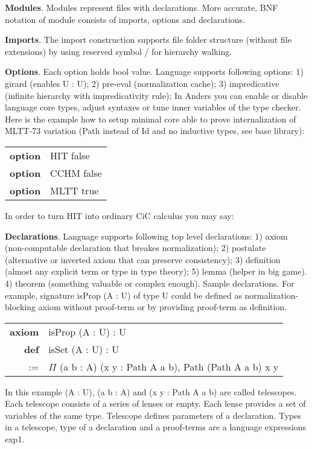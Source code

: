 \documentclass[a4paper,UKenglish,cleveref, autoref, thm-restate]{lipics-v2021}
\begin{document}
\textbf{Modules}. Modules represent files with declarations. More accurate, BNF notation of module consists of imports, options and declarations.

\textbf{Imports}. The import construction supports file folder structure (without file extensions) by using reserved symbol / for hierarchy walking.

\textbf{Options}. Each option holds bool value. Language supports following options: 1) girard (enables U : U); 2) pre-eval (normalization cache);
3) impredicative (infinite hierarchy with impredicativity rule);
In Anders you can enable or disable language core types, adjust syntaxes or tune inner variables of the type checker. Here is the example how to setup minimal core able to prove internalization of MLTT-73 variation (Path instead of Id and no inductive types, see base library):

\begin{table}[ht]
\begin{tabular}{rl}
\textbf{option} & HIT false \\
\textbf{option} & CCHM false \\
\textbf{option} & MLTT true \\
\end{tabular}
\end{table}

In order to turn HIT into ordinary CiC calculus you may say:

\textbf{Declarations}. Language supports following top level declarations: 1) axiom (non-computable declaration that breakes normalization); 2) postulate (alternative or inverted axiom that can preserve consistency); 3) definition (almost any explicit term or type in type theory); 5) lemma (helper in big game). 4) theorem (something valuable or complex enough).
Sample declarations. For example, signature isProp (A : U) of type U could be defined as normalization-blocking axiom without proof-term or by providing proof-term as definition.
\begin{table}[ht]
\begin{tabular}{rl}
\textbf{axiom} & isProp (A : U) : U \\
\textbf{def} & isSet (A : U) : U \\
 := & \textbf{$\Pi$} (a b : A) (x y : Path A a b), Path (Path A a b) x y \\
\end{tabular}
\end{table}


In this example (A : U), (a b : A) and (x y : Path A a b) are called telescopes. Each telescope consists of a series of lenses or empty. Each lense provides a set of variables of the same type. Telescope defines parameters of a declaration. Types in a telescope, type of a declaration and a proof-terms are a language expressions exp1.
\end{document}
